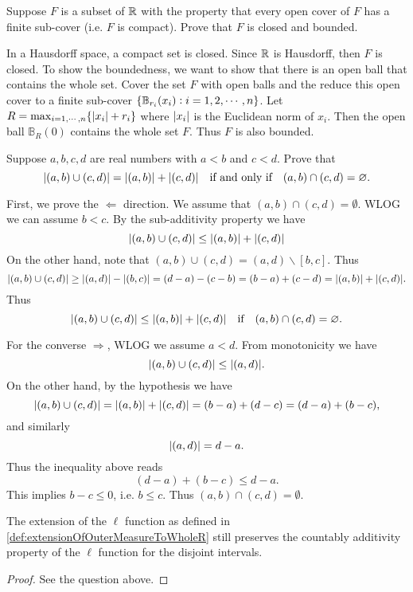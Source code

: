 \begin{problem}
	Suppose $ F $ is a subset of $ \mathbb{R} $ with the property that every open cover of $ F $ has a finite sub-cover (i.e. $ F $ is compact). Prove that $ F $ is closed and bounded.
\end{problem}
\begin{solution}
	In a Hausdorff space, a compact set is closed. Since $ \mathbb{R} $ is Hausdorff, then $ F $ is closed. To show the boundedness, we want to show that there is an open ball that contains the whole set. Cover the set $ F $ with open balls and the reduce this open cover to a finite sub-cover $ \{\mathbb{B}_{r_i}(x_i): i=1,2,\cdots,n\} $.
	Let $ R = \max_{i=1,\cdots,n}\{|x_i|+r_i\} $ where $ |x_i| $ is the Euclidean norm of $ x_i $. Then the open ball $ \mathbb{B}_R(0) $ contains the whole set $ F $. Thus $ F $ is also bounded. 
\end{solution}

\begin{problem}
	\label{problem:finiteDisjointAdditivity}
	Suppose $ a,b,c,d $ are real numbers with $ a < b $ and $ c < d $. Prove that 
	\[ |(a,b)\cup (c,d)| = |(a,b)| + |(c,d)| \quad \text{if and only if} \quad (a,b) \cap (c,d) = \varnothing. \]
\end{problem}
\begin{solution}
	First, we prove the $ \boxed{\Longleftarrow} $ direction. We assume that $ (a,b) \cap (c,d) = \emptyset $. WLOG we can assume $ b < c $. By the sub-additivity property we have
	\[ |(a,b)\cup (c,d)| \leq |(a,b)| + |(c,d)| \]
	On the other hand, note that $ (a,b)\cup(c,d) = (a,d) \backslash [b,c] $. Thus
	\[ |(a,b)\cup (c,d)| \geq |(a,d)| - |(b,c)| = (d-a) - (c-b) = (b-a) + (c-d) = |(a,b)| + |(c,d)|. \]
	Thus
	\[ |(a,b)\cup (c,d)| \leq |(a,b)| + |(c,d)| \quad \text{if} \quad (a,b)\cap (c,d) = \varnothing. \]
	
	For the converse $ \boxed{\Longrightarrow} $, WLOG we assume $ a<d $. From monotonicity we have
	\[ |(a,b)\cup (c,d)| \leq |(a,d)|.  \]
	On the other hand, by the hypothesis we have
	\[ |(a,b)\cup (c,d)| = |(a,b)| + |(c,d)| = (b-a) + (d-c) = (d-a) + (b-c), \]
	and similarly
	\[ |(a,d)| = d-a. \]
	Thus the inequality above reads
	\[ (d-a) + (b-c) \leq d-a. \]
	This implies $ b-c \leq 0 $, i.e. $ b \leq c $. Thus $ (a,b)\cap (c,d) = \emptyset $.
\end{solution}
\begin{proposition}
	The extension of the $ \ell $ function as defined in \autoref{def:extensionOfOuterMeasureToWholeR} still preserves the countably additivity property of the $ \ell $ function for the disjoint intervals.
\end{proposition}
\begin{proof}
	See the question above.
\end{proof}


